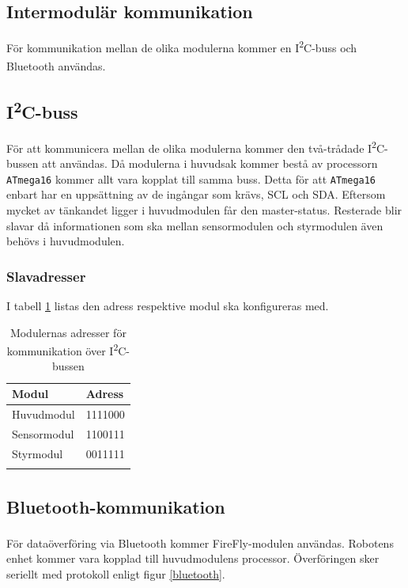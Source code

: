 \documentclass[11pt]{article}
\begin{document}
\begin{flushleft}
\pagebreak
\section{Intermodulär kommunikation}\label{Intermodulär kommunikation}
För kommunikation mellan de olika modulerna kommer en I\textsuperscript{2}C-buss och Bluetooth\textsuperscript{\circledR} användas. 

\subsection{I\textsuperscript{2}C-buss}

För att kommunicera mellan de olika modulerna kommer den två-trådade I\textsuperscript{2}C-bussen att användas. Då modulerna i huvudsak kommer bestå av processorn \verb+ATmega16+ kommer allt vara kopplat till samma buss. Detta för att \verb+ATmega16+ enbart har en uppsättning av de ingångar som krävs, SCL och SDA. Eftersom mycket av tänkandet ligger i huvudmodulen får den master-status. Resterade blir slavar då informationen som ska mellan sensormodulen och styrmodulen även behövs i huvudmodulen.

\subsubsection{Slavadresser}
I tabell \ref{slavAdress} listas den adress respektive modul ska konfigureras med. 

\begin{center}
\begin{longtable}{|l|l|} \hline
\textbf{Modul} & \textbf{Adress}\\ \hline 
Huvudmodul & 1111000 \\ \hline
Sensormodul & 1100111 \\ \hline
Styrmodul & 0011111\\ \hline
\caption{Modulernas adresser för kommunikation över I\textsuperscript{2}C-bussen}
\label{slavAdress}
\end{longtable}
\end{center}


\subsection{Bluetooth\textsuperscript{\circledR}-kommunikation}
För dataöverföring via Bluetooth\textsuperscript{\circledR} kommer FireFly-modulen användas. Robotens enhet kommer vara kopplad till huvudmodulens processor. Överföringen sker seriellt med protokoll enligt figur \ref{bluetooth}.


\end{flushleft}
\end{document}
